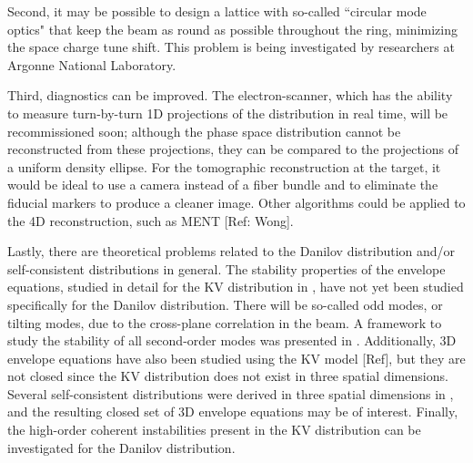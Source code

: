 Second, it may be possible to design a lattice with so-called ``circular mode optics" that keep the beam as round as possible throughout the ring, minimizing the space charge tune shift. This problem is being investigated by researchers at Argonne National Laboratory. 

Third, diagnostics can be improved. The electron-scanner, which has the ability to measure turn-by-turn 1D projections of the distribution in real time, will be recommissioned soon; although the phase space distribution cannot be reconstructed from these projections, they can be compared to the projections of a uniform density ellipse. For the tomographic reconstruction at the target, it would be ideal to use a camera instead of a fiber bundle and to eliminate the fiducial markers to produce a cleaner image. Other algorithms could be applied to the 4D reconstruction, such as MENT [Ref: Wong].

Lastly, there are theoretical problems related to the Danilov distribution and/or self-consistent distributions in general. The stability properties of the envelope equations, studied in detail for the KV distribution in \cite{Lund2004}, have not yet been studied specifically for the Danilov distribution. There will be so-called odd modes, or tilting modes, due to the cross-plane correlation in the beam. A framework to study the stability of all second-order modes was presented in \cite{Yuan2017}. Additionally, 3D envelope equations have also been studied using the KV model [Ref], but they are not closed since the KV distribution does not exist in three spatial dimensions. Several self-consistent distributions were derived in three spatial dimensions in \cite{Danilov2003}, and the resulting closed set of 3D envelope equations may be of interest. Finally, the high-order coherent instabilities present in the KV distribution can be investigated for the Danilov distribution.